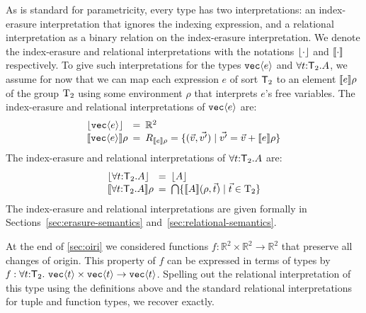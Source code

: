 As is standard for parametricity, every type has two interpretations:
an index-erasure interpretation that ignores the indexing expression,
and a relational interpretation as a binary relation on the
index-erasure interpretation. We denote the index-erasure and
relational interpretations with the notations $\left\lfloor \cdot \right\rfloor$ and
$\llbracket \cdot \rrbracket{}$ respectively. To give such interpretations for the
types $\textup{\texttt{vec}}\langle e \rangle$ and $\forall t\mathord:\mathsf{T}_2.A$, we
assume for now that we can map each expression $e$ of sort
$\mathsf{T}_2$ to an element $\llbracket e \rrbracket\rho$ of the group $\mathrm{T}_2$
using some environment $\rho$ that interprets $e$'s free
variables. The index-erasure and relational interpretations of
$\textup{\texttt{vec}}\langle e \rangle$ are:
\begin{displaymath}
  \begin{array}{l@{\hspace{0.5em}=\hspace{0.5em}}l}
    \tySem{\tyPrim{vec}{e}} & \mathbb{R}^2
    \\ \rsem{\tyPrim{vec}{e}}{}\rho & R_{\sem{e}\rho} = \{
    (\vec{v},\vec{v'}) \sepbar \vec{v'} = \vec{v} + \sem{e}\rho \}
  \end{array}
\end{displaymath}
The index-erasure and relational interpretations of 
$\forall t\mathord:\mathsf{T}_2.A$ are:
\begin{displaymath}
  \begin{array}{l@{\hspace{0.5em}=\hspace{0.5em}}l}
    \tySem{\forall t\mathord:\SynTransl{2}.A} & \tySem{A}
    \\ \rsem{\forall t\mathord:\SynTransl{2}.A}{}\rho & \bigcap\{
    \rsem{A}{}{(\rho,\vec{t})} \sepbar \vec{t} \in \Transl{2} \}
  \end{array}
\end{displaymath}
The index-erasure and relational interpretations are given
formally in Sections~\ref{sec:erasure-semantics}
and~\ref{sec:relational-semantics}. %

At the end of \autoref{sec:oiri} we considered functions $f :
\mathbb{R}^2 \times \mathbb{R}^2 \to \mathbb{R}^2$ that preserve all
changes of origin. This property of $f$ can be expressed in terms of
types by
$  \mathit{f} : \forall t \mathord: \SynTransl{2}.\ \tyPrim{vec}{t}
  \times \tyPrim{vec}{t} \to \tyPrim{vec}{t}$.
Spelling out the relational interpretation of this type using the
definitions above and the standard relational interpretations for
tuple and function types, we recover
 exactly.

